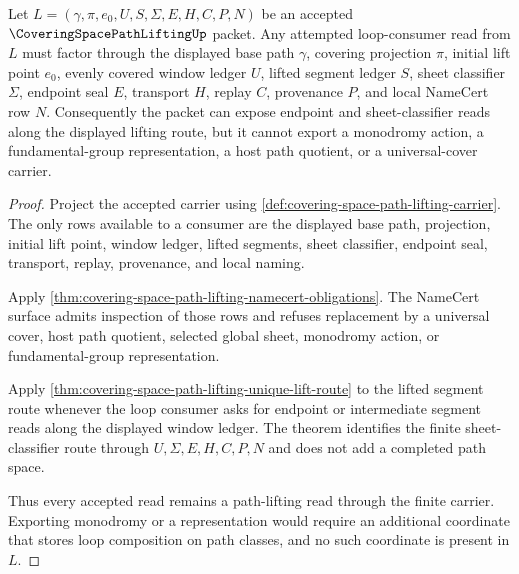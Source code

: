 \begin{theorem}
\label{thm:covering-space-path-lifting-monodromy-boundary}
Let $L=(\gamma,\pi,e_0,U,S,\Sigma,E,H,C,P,N)$ be an accepted $\CoveringSpacePathLiftingUp$ packet. Any attempted loop-consumer read from $L$ must factor through the displayed base path $\gamma$, covering projection $\pi$, initial lift point $e_0$, evenly covered window ledger $U$, lifted segment ledger $S$, sheet classifier $\Sigma$, endpoint seal $E$, transport $H$, replay $C$, provenance $P$, and local NameCert row $N$. Consequently the packet can expose endpoint and sheet-classifier reads along the displayed lifting route, but it cannot export a monodromy action, a fundamental-group representation, a host path quotient, or a universal-cover carrier.
\end{theorem}
\begin{proof}
Project the accepted carrier using \autoref{def:covering-space-path-lifting-carrier}. The only rows available to a consumer are the displayed base path, projection, initial lift point, window ledger, lifted segments, sheet classifier, endpoint seal, transport, replay, provenance, and local naming.

Apply \autoref{thm:covering-space-path-lifting-namecert-obligations}. The NameCert surface admits inspection of those rows and refuses replacement by a universal cover, host path quotient, selected global sheet, monodromy action, or fundamental-group representation.

Apply \autoref{thm:covering-space-path-lifting-unique-lift-route} to the lifted segment route whenever the loop consumer asks for endpoint or intermediate segment reads along the displayed window ledger. The theorem identifies the finite sheet-classifier route through $U,\Sigma,E,H,C,P,N$ and does not add a completed path space.

Thus every accepted read remains a path-lifting read through the finite carrier. Exporting monodromy or a representation would require an additional coordinate that stores loop composition on path classes, and no such coordinate is present in $L$.
\end{proof}


